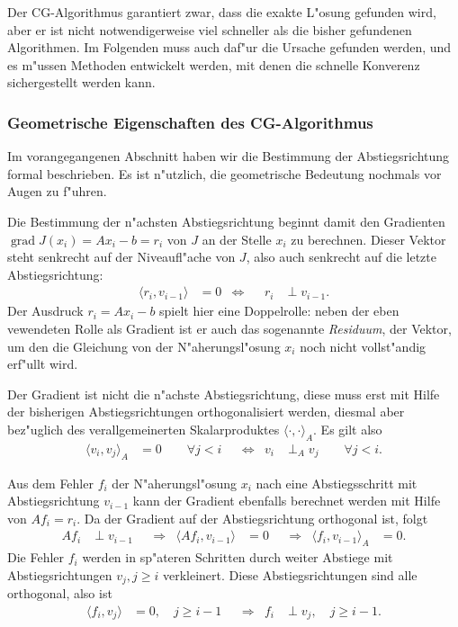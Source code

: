 Der CG-Algorithmus garantiert zwar, dass die exakte L"osung gefunden
wird, aber er ist nicht notwendigerweise viel schneller als die bisher
gefundenen Algorithmen.
Im Folgenden muss auch daf"ur die Ursache gefunden werden, und es m"ussen
Methoden entwickelt werden, mit denen die schnelle Konverenz sichergestellt
werden kann.

\subsubsection{Geometrische Eigenschaften des CG-Algorithmus}
Im vorangegangenen Abschnitt haben wir die Bestimmung der Abstiegsrichtung
formal beschrieben. Es ist n"utzlich, die geometrische Bedeutung nochmals
vor Augen zu f"uhren. 

Die Bestimmung der n"achsten Abstiegsrichtung beginnt damit den Gradienten
$\operatorname{grad}J(x_i)=Ax_i-b=r_i$
von $J$ an der Stelle $x_i$ zu berechnen. Dieser Vektor steht
senkrecht auf der Niveaufl"ache von $J$, also auch senkrecht auf die
letzte Abstiegsrichtung:
\begin{align}
\langle r_i,v_{i-1}\rangle &= 0
&\Leftrightarrow&&
r_i&\perp v_{i-1}.
\label{descent:rorthogonal}
\end{align}
Der Ausdruck $r_i=Ax_i-b$ spielt hier eine Doppelrolle: neben der eben
vewendeten Rolle als Gradient ist er auch das sogenannte {\em Residuum},
der Vektor, um den die Gleichung von der N"aherungsl"osung $x_i$
noch nicht vollst"andig erf"ullt wird.

Der Gradient ist nicht die n"achste Abstiegsrichtung, diese muss erst
mit Hilfe der bisherigen Abstiegsrichtungen orthogonalisiert werden,
diesmal aber bez"uglich des verallgemeinerten Skalarproduktes
$\langle\cdot,\cdot\rangle_A$. Es gilt also
\begin{align}
\langle v_i,v_j\rangle_A&=0\qquad\forall j < i
&&\Leftrightarrow&
v_i&\perp_A v_j\qquad\forall j< i.
\label{descent:vorthogonalA}
\end{align}

Aus dem Fehler $f_i$ der N"aherungsl"osung $x_i$ nach eine Abstiegsschritt
mit Abstiegsrichtung $v_{i-1}$ kann der Gradient ebenfalls berechnet werden
mit Hilfe von $Af_i=r_i$.
Da der Gradient auf der Abstiegsrichtung orthogonal ist, folgt
\begin{align}
Af_i&\perp v_{i-1}
&&\Rightarrow&
\langle Af_i,v_{i-1}\rangle&=0
&&\Rightarrow&
\langle f_i,v_{i-1}\rangle_A&=0.
\end{align}
Die Fehler $f_i$ werden in sp"ateren Schritten durch weiter Abstiege
mit Abstiegsrichtungen $v_j, j\ge i$ verkleinert.
Diese Abstiegsrichtungen sind alle orthogonal, also ist
\begin{align*}
\langle f_i,v_j\rangle&=0,\quad j\ge i-1
&&\Rightarrow&
f_i&\perp v_j,\quad j\ge i-1.
\end{align*}

